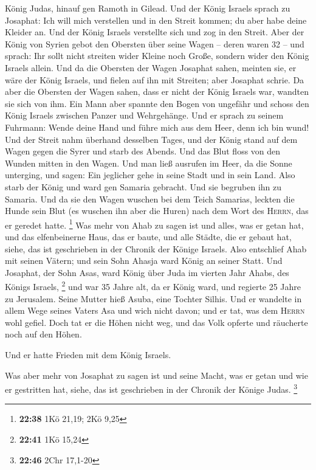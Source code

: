 König Judas, hinauf gen Ramoth in Gilead.  Und der König
Israels sprach zu Josaphat: Ich will mich verstellen und in den Streit
kommen; du aber habe deine Kleider an. Und der König Israels verstellte
sich und zog in den Streit.  Aber der König von Syrien
gebot den Obersten über seine Wagen -- deren waren 32 -- und sprach: Ihr
sollt nicht streiten wider Kleine noch Große, sondern wider den König
Israels allein.  Und da die Obersten der Wagen Josaphat
sahen, meinten sie, er wäre der König Israels, und fielen auf ihn mit
Streiten; aber Josaphat schrie.  Da aber die Obersten der
Wagen sahen, dass er nicht der König Israels war, wandten sie sich von
ihm.  Ein Mann aber spannte den Bogen von ungefähr und
schoss den König Israels zwischen Panzer und Wehrgehänge. Und er sprach
zu seinem Fuhrmann: Wende deine Hand und führe mich aus dem Heer, denn
ich bin wund!  Und der Streit nahm überhand desselben
Tages, und der König stand auf dem Wagen gegen die Syrer und starb des
Abends. Und das Blut floss von den Wunden mitten in den Wagen.
 Und man ließ ausrufen im Heer, da die Sonne unterging,
und sagen: Ein jeglicher gehe in seine Stadt und in sein Land.
 Also starb der König und ward gen Samaria gebracht. Und
sie begruben ihn zu Samaria.  Und da sie den Wagen
wuschen bei dem Teich Samarias, leckten die Hunde sein Blut (es wuschen
ihn aber die Huren) nach dem Wort des \textsc{Herrn}, das er geredet
hatte. \footnote{\textbf{22:38} 1Kö 21,19; 2Kö 9,25}  Was
mehr von Ahab zu sagen ist und alles, was er getan hat, und das
elfenbeinerne Haus, das er baute, und alle Städte, die er gebaut hat,
siehe, das ist geschrieben in der Chronik der Könige Israels.
 Also entschlief Ahab mit seinen Vätern; und sein Sohn
Ahasja ward König an seiner Statt.  Und Josaphat, der
Sohn Asas, ward König über Juda im vierten Jahr Ahabs, des Königs
Israels, \footnote{\textbf{22:41} 1Kö 15,24}  und war 35
Jahre alt, da er König ward, und regierte 25 Jahre zu Jerusalem. Seine
Mutter hieß Asuba, eine Tochter Silhis.  Und er wandelte
in allem Wege seines Vaters Asa und wich nicht davon; und er tat, was
dem \textsc{Herrn} wohl gefiel.  Doch tat er die Höhen
nicht weg, und das Volk opferte und räucherte noch auf den Höhen.

 Und er hatte Frieden mit dem König Israels.

 Was aber mehr von Josaphat zu sagen ist und seine Macht,
was er getan und wie er gestritten hat, siehe, das ist geschrieben in
der Chronik der Könige Judas. \footnote{\textbf{22:46} 2Chr 17,1-20}


